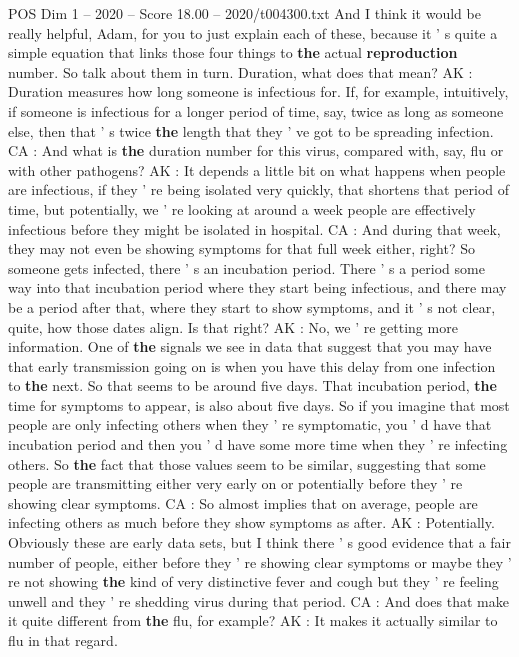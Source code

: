 \begin{textsample}{POS Dim 1 – 2020 – Score 18.00 – 2020/t004300.txt}
And I think it would be really helpful, Adam, for you to just explain each of these, because it ' s quite a simple equation that links those four things to \textbf{the} actual \textbf{reproduction} number.
So talk about them in turn.
Duration, what does that mean?
AK : Duration measures how long someone is infectious for.
If, for example, intuitively, if someone is infectious for a longer period of time, say, twice as long as someone else, then that ' s twice \textbf{the} length that they ' ve got to be spreading infection.
CA : And what is \textbf{the} duration number for this virus, compared with, say, flu or with other pathogens?
AK : It depends a little bit on what happens when people are infectious, if they ' re being isolated very quickly, that shortens that period of time, but potentially, we ' re looking at around a week people are effectively infectious before they might be isolated in hospital.
CA : And during that week, they may not even be showing symptoms for that full week either, right?
So someone gets infected, there ' s an incubation period.
There ' s a period some way into that incubation period where they start being infectious, and there may be a period after that, where they start to show symptoms, and it ' s not clear, quite, how those dates align.
Is that right?
AK : No, we ' re getting more information.
One of \textbf{the} signals we see in data that suggest that you may have that early transmission going on is when you have this delay from one infection to \textbf{the} next.
So that seems to be around five days.
That incubation period, \textbf{the} time for symptoms to appear, is also about five days.
So if you imagine that most people are only infecting others when they ' re symptomatic, you ' d have that incubation period and then you ' d have some more time when they ' re infecting others.
So \textbf{the} fact that those values seem to be similar, suggesting that some people are transmitting either very early on or potentially before they ' re showing clear symptoms.
CA : So almost implies that on average, people are infecting others as much before they show symptoms as after.
AK : Potentially.
Obviously these are early data sets, but I think there ' s good evidence that a fair number of people, either before they ' re showing clear symptoms or maybe they ' re not showing \textbf{the} kind of very distinctive fever and cough but they ' re feeling unwell and they ' re shedding virus during that period.
CA : And does that make it quite different from \textbf{the} flu, for example?
AK : It makes it actually similar to flu in that regard.

\end{textsample}
